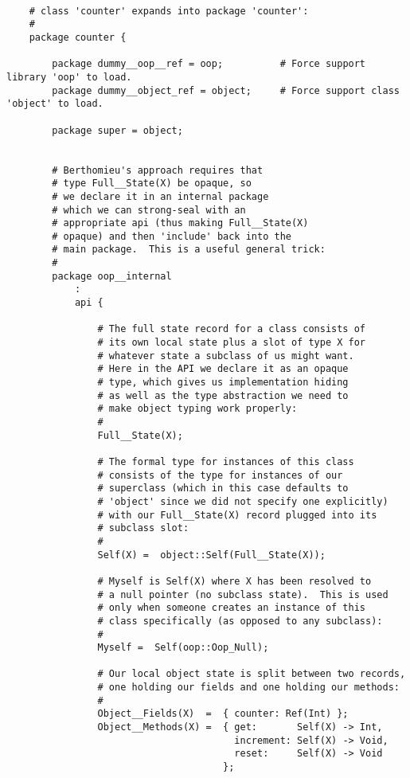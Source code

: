 \begin{verbatim}

    # class 'counter' expands into package 'counter':
    #
    package counter {

        package dummy__oop__ref = oop;          # Force support library 'oop' to load.
        package dummy__object_ref = object;     # Force support class 'object' to load.

        package super = object;


        # Berthomieu's approach requires that
        # type Full__State(X) be opaque, so
        # we declare it in an internal package
        # which we can strong-seal with an
        # appropriate api (thus making Full__State(X)
        # opaque) and then 'include' back into the
        # main package.  This is a useful general trick:
        #
        package oop__internal
            :  
            api {

                # The full state record for a class consists of
                # its own local state plus a slot of type X for
                # whatever state a subclass of us might want.
                # Here in the API we declare it as an opaque
                # type, which gives us implementation hiding
                # as well as the type abstraction we need to
                # make object typing work properly:
                #
                Full__State(X);

                # The formal type for instances of this class
                # consists of the type for instances of our
                # superclass (which in this case defaults to
                # 'object' since we did not specify one explicitly)
                # with our Full__State(X) record plugged into its
                # subclass slot:
                # 
                Self(X) =  object::Self(Full__State(X));

                # Myself is Self(X) where X has been resolved to
                # a null pointer (no subclass state).  This is used
                # only when someone creates an instance of this
                # class specifically (as opposed to any subclass):
                #
                Myself =  Self(oop::Oop_Null);

                # Our local object state is split between two records,
                # one holding our fields and one holding our methods:
                #
                Object__Fields(X)  =  { counter: Ref(Int) };
                Object__Methods(X) =  { get:       Self(X) -> Int,
                                        increment: Self(X) -> Void, 
                                        reset:     Self(X) -> Void
                                      };


\end{verbatim}
